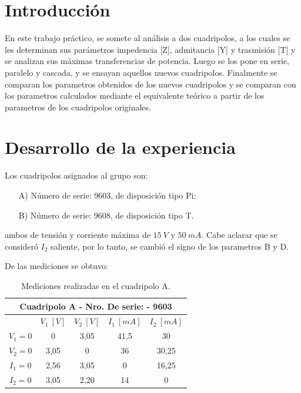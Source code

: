 \documentclass[a4paper]{article}
\begin{document}




\section*{Introducción}

En este trabajo práctico, se somete al análisis a dos cuadripolos, a los cuales se les determinan sus parámetros impedencia [Z], admitancia [Y] y trasmisión [T] y se analizan sus máximas transferencias de potencia. Luego se los pone en serie, paralelo y cascada, y se ensayan aquellos nuevos cuadripolos. Finalmente se comparan los parametros obtenidos de los nuevos cuadripolos y se comparan con los parametros calculados mediante el equivalente teórico a partir de los parametros de los cuadripolos originales.

\section*{Desarrollo de la experiencia}

Los cuadripolos asignados al grupo son:
\begin{enumerate}
	\item[A)] Número de serie: 9603, de disposición tipo Pi;
	\item[B)] Número de serie: 9608, de disposición tipo T.
\end{enumerate}
ambos de tensión y corriente máxima de $15 \ V$ y $50 \ mA$. Cabe aclarar que se consideró $I_2$ saliente, por lo tanto, se cambió el signo de los parametros B y D.

De las mediciones se obtuvo:

\begin{table}[H]
\begin{center}
\begin{tabular}{|c|c|c|c|c|}
\hline
\multicolumn{5}{|c|}{Cuadripolo A - Nro. De serie: - 9603} \\ \hline
 & $V_1 \ [V]$ & $V_2 \ [V]$ & $I_1 \ [mA]$ & $I_2 \ [mA]$ \\ \hline
$V_1 = 0$ & 0 & 3,05 & 41,5 & 30 \\ \hline
$V_2 = 0$ & 3,05 & 0 & 36 & 30,25 \\ \hline
$I_1 = 0$ & 2,56 & 3,05 & 0 & 16,25 \\ \hline
$I_2 = 0$ & 3,05 & 2,20 & 14 & 0 \\ \hline
\end{tabular}
\caption{Mediciones realizadas en el cuadripolo A.}
\end{center}
\end{table}
\end{document}
